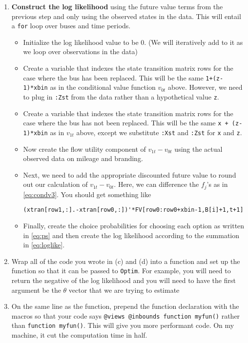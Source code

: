 \documentclass[12pt,english]{article}
\begin{document}
\begin{enumerate}
\begin{enumerate}
        \item \textbf{Construct the log likelihood} using the future value terms from the previous step and only using the observed states in the data. This will entail a \texttt{for} loop over buses and time periods.
        \begin{itemize}
            \item Initialize the log likelihood value to be 0. (We will iteratively add to it as we loop over observations in the data)
            \item Create a variable that indexes the state transition matrix rows for the case where the bus has been replaced. This will be the same \texttt{1+(z-1)*xbin} as in the conditional value function $v_{0t}$ above. However, we need to plug in \texttt{:Zst} from the data rather than a hypothetical value \texttt{z}.
            \item Create a variable that indexes the state transition matrix rows for the case where the bus has not been replaced. This will be the same \texttt{x + (z-1)*xbin} as in $v_{1t}$ above, except we substitute \texttt{:Xst} and \texttt{:Zst} for \texttt{x} and \texttt{z}.
            \item Now create the flow utility component of $v_{1t}-v_{0t}$ using the actual observed data on mileage and branding.
            \item Next, we need to add the appropriate discounted future value to round out our calculation of $v_{1t}-v_{0t}$. Here, we can difference the $f_j$'s as in \eqref{eq:condv3}. You should get something like
                \begin{verbatim}
(xtran[row1,:].-xtran[row0,:])'*FV[row0:row0+xbin-1,B[i]+1,t+1]
                \end{verbatim}
            \item Finally, create the choice probabilities for choosing each option as written in \eqref{eq:ps} and then create the log likelihood according to the summation in \eqref{eq:loglike}.
        \end{itemize}
    \item Wrap all of the code you wrote in (c) and (d) into a function and set up the function so that it can be passed to \texttt{Optim}. For example, you will need to return the negative of the log likelihood and you will need to have the first argument be the $\theta$ vector that we are trying to estimate
    \item On the same line as the function, prepend the function declaration with the macros so that your code says \texttt{@views @inbounds function myfun()} rather than \texttt{function myfun()}. This will give you more performant code. On my machine, it cut the computation time in half.

\end{enumerate}
\end{enumerate}
\end{document}
